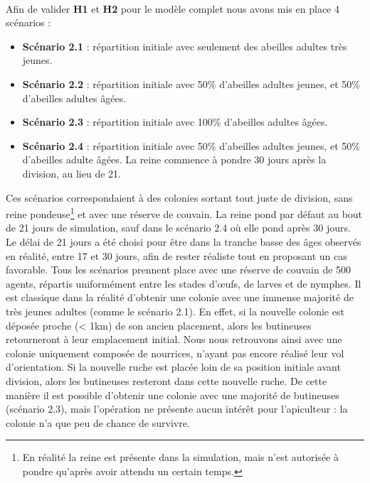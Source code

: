 			\paragraph{}
			
			Afin de valider \textbf{H1} et \textbf{H2} pour le modèle complet nous avons mis en place 4 scénarios :			
			\begin{itemize}
					\item \textbf{Scénario 2.1} : répartition initiale avec seulement des abeilles adultes très jeunes.
					\item \textbf{Scénario 2.2} : répartition initiale avec 50\% d'abeilles adultes jeunes, et 50\% d'abeilles adultes âgées.
					\item \textbf{Scénario 2.3} : répartition initiale avec 100\% d'abeilles adultes âgées.
					\item \textbf{Scénario 2.4} : répartition initiale avec 50\% d'abeilles adultes jeunes, et 50\% d'abeilles adulte âgées. La reine commence à pondre 30 jours après la division, au lieu de 21.
			\end{itemize}
			
			Ces scénarios correspondaient à des colonies sortant tout juste de division, sans reine pondeuse\footnote{En réalité la reine est présente dans la simulation, mais n'est autorisée à pondre qu'après avoir attendu un certain temps.} et avec une réserve de couvain. La reine pond par défaut au bout de 21 jours de simulation, sauf dans le scénario 2.4 où elle pond après 30 jours. Le délai de 21 jours a été choisi pour être dans la tranche basse des âges observés en réalité, entre 17 et 30 jours, afin de rester réaliste tout en proposant un cas favorable. Tous les scénarios prennent place avec une réserve de couvain de 500 agents, répartis uniformément entre les stades d'œufs, de larves et de nymphes. Il est classique dans la réalité d'obtenir une colonie avec une immense majorité de très jeunes adultes (comme le scénario 2.1). En effet, si la nouvelle colonie est déposée proche (< 1km) de son ancien placement, alors les butineuses retourneront à leur emplacement initial. Nous nous retrouvons ainsi avec une colonie uniquement composée de nourrices, n'ayant pas encore réalisé leur vol d'orientation. Si la nouvelle ruche est placée loin de sa position initiale avant division, alors les butineuses resteront dans cette nouvelle ruche. De cette manière il est possible d'obtenir une colonie avec une majorité de butineuses (scénario 2.3), mais l'opération ne présente aucun intérêt pour l'apiculteur : la colonie n'a que peu de chance de survivre.
			
